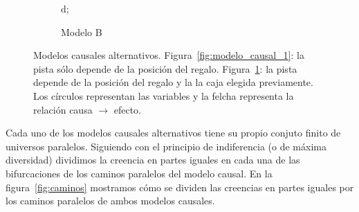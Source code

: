 \documentclass[a4paper,10pt]{book}
\theoremstyle{definition}
\begin{document}
\begin{figure}[ht!]
\begin{subfigure}[b]{0.48\textwidth}
{     {d};
  }
  \caption{Modelo B}
  \label{fig:modelo_causal_2}
  \end{subfigure}
  \caption{Modelos causales alternativos. Figura~\ref{fig:modelo_causal_1}: la pista s\'olo depende de la posici\'on del regalo. Figura~\ref{fig:modelo_causal_2}: la pista depende de la posici\'on del regalo y la la caja elegida previamente.
  Los c\'irculos representan las variables y la felcha representa la relaci\'on causa $\rightarrow$ efecto. 
  }
  \label{fig:modelos_causales}
\end{figure}

% 


Cada uno de los modelos causales alternativos tiene su propio conjuto finito de universos paralelos.
%
Siguiendo con el principio de indiferencia (o de m\'axima diversidad) dividimos la creencia en partes iguales en cada una de las bifurcaciones de los caminos paralelos del modelo causal.
%
En la figura~\ref{fig:caminos} mostramos c\'omo se dividen las creencias en partes iguales por los caminos paralelos de ambos modelos causales.

\end{document}
